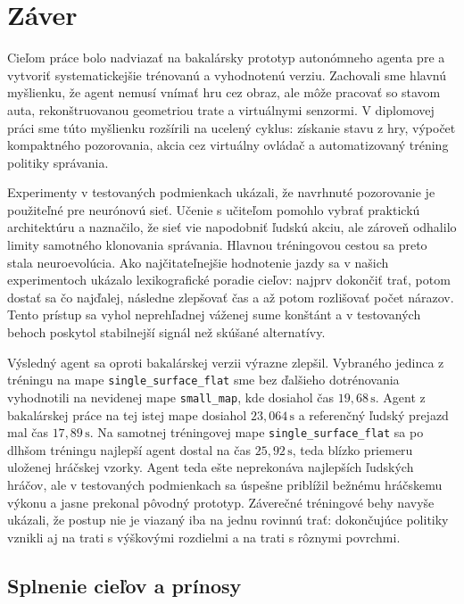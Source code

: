 \chapter*{Záver}

Cieľom práce bolo nadviazať na bakalársky prototyp autonómneho agenta pre \Trackmania{} a vytvoriť systematickejšie trénovanú a vyhodnotenú verziu. Zachovali sme hlavnú myšlienku, že agent nemusí vnímať hru cez obraz, ale môže pracovať so stavom auta, rekonštruovanou geometriou trate a virtuálnymi senzormi. V diplomovej práci sme túto myšlienku rozšírili na ucelený cyklus: získanie stavu z hry, výpočet kompaktného pozorovania, akcia cez virtuálny ovládač a automatizovaný tréning politiky správania.

Experimenty v testovaných podmienkach ukázali, že navrhnuté pozorovanie je použiteľné pre neurónovú sieť. Učenie s učiteľom pomohlo vybrať praktickú architektúru a naznačilo, že sieť vie napodobniť ľudskú akciu, ale zároveň odhalilo limity samotného klonovania správania. Hlavnou tréningovou cestou sa preto stala neuroevolúcia. Ako najčitateľnejšie hodnotenie jazdy sa v našich experimentoch ukázalo lexikografické poradie cieľov: najprv dokončiť trať, potom dostať sa čo najďalej, následne zlepšovať čas a až potom rozlišovať počet nárazov. Tento prístup sa vyhol neprehľadnej váženej sume konštánt a v testovaných behoch poskytol stabilnejší signál než skúšané alternatívy.

Výsledný agent sa oproti bakalárskej verzii výrazne zlepšil. Vybraného jedinca z tréningu na mape \texttt{single\_surface\_flat} sme bez ďalšieho dotrénovania vyhodnotili na nevidenej mape \texttt{small\_map}, kde dosiahol čas \(19{,}68\,\mathrm{s}\). Agent z bakalárskej práce na tej istej mape dosiahol \(23{,}064\,\mathrm{s}\) a referenčný ľudský prejazd mal čas \(17{,}89\,\mathrm{s}\). Na samotnej tréningovej mape \texttt{single\_surface\_flat} sa po dlhšom tréningu najlepší agent dostal na čas \(25{,}92\,\mathrm{s}\), teda blízko priemeru uloženej hráčskej vzorky. Agent teda ešte neprekonáva najlepších ľudských hráčov, ale v testovaných podmienkach sa úspešne priblížil bežnému hráčskemu výkonu a jasne prekonal pôvodný prototyp. Záverečné tréningové behy navyše ukázali, že postup nie je viazaný iba na jednu rovinnú trať: dokončujúce politiky vznikli aj na trati s výškovými rozdielmi a na trati s rôznymi povrchmi.

\section*{Splnenie cieľov a prínosy}

